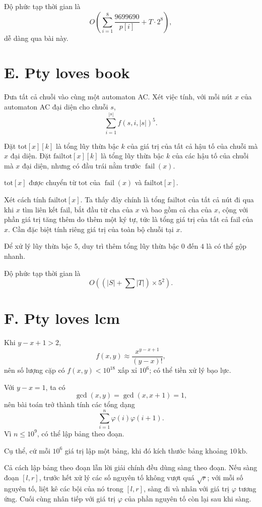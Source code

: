 \documentclass[11pt]{article}
\begin{document}
Độ phức tạp thời gian là
\[
  O\left(\sum_{i=1}^{8}\frac{9699690}{p[i]}+T\cdot 2^8\right),
\]
dễ dàng qua bài này.

\section{E. Pty loves book}

Đưa tất cả chuỗi vào cùng một automaton AC. Xét việc tính, với mỗi nút $x$
của automaton AC đại diện cho chuỗi $s$,
\[
  \sum_{i=1}^{|s|} f(s,i,|s|)^5.
\]

Đặt $\mathrm{tot}[x][k]$ là tổng lũy thừa bậc $k$ của giá trị của tất cả hậu
tố của chuỗi mà $x$ đại diện. Đặt $\mathrm{failtot}[x][k]$ là tổng lũy thừa
bậc $k$ của các hậu tố của chuỗi mà $x$ đại diện, nhưng có đầu trái nằm trước
\(\operatorname{fail}(x)\).

$\mathrm{tot}[x]$ được chuyển từ $\mathrm{tot}$ của
\(\operatorname{fail}(x)\) và $\mathrm{failtot}[x]$.

Xét cách tính $\mathrm{failtot}[x]$. Ta thấy đây chính là tổng
$\mathrm{failtot}$ của tất cả nút đi qua khi $x$ tìm liên kết fail, bắt đầu
từ cha của $x$ và bao gồm cả cha của $x$, cộng với phần giá trị tăng thêm do
thêm một ký tự, tức là tổng giá trị của tất cả fail của $x$. Cần đặc biệt
tính riêng giá trị của toàn bộ chuỗi tại $x$.

Để xử lý lũy thừa bậc $5$, duy trì thêm tổng lũy thừa bậc $0$ đến $4$ là có
thể gộp nhanh.

Độ phức tạp thời gian là
\[
  O\left(\left(|S|+\sum |T|\right)\times 5^2\right).
\]

\section{F. Pty loves lcm}

Khi $y-x+1>2$,
\[
  f(x,y)\approx \frac{x^{y-x+1}}{(y-x)!},
\]
nên số lượng cặp có $f(x,y)<10^{18}$ xấp xỉ $10^6$; có thể tiền xử lý bạo
lực.

Với $y-x=1$, ta có
\[
  \gcd(x,y)=\gcd(x,x+1)=1,
\]
nên bài toán trở thành tính các tổng dạng
\[
  \sum_{i=1}^{n}\varphi(i)\varphi(i+1).
\]
Vì $n\le 10^9$, có thể lập bảng theo đoạn.

Cụ thể, cứ mỗi $10^6$ giá trị lập một bảng, khi đó kích thước bảng khoảng
$10\,\mathrm{kb}$.

Cả cách lập bảng theo đoạn lẫn lời giải chính đều dùng sàng theo đoạn. Nếu
sàng đoạn $[l,r]$, trước hết xử lý các số nguyên tố không vượt quá
$\sqrt r$; với mỗi số nguyên tố, liệt kê các bội của nó trong $[l,r]$, sàng
đi và nhân với giá trị $\varphi$ tương ứng. Cuối cùng nhân tiếp với giá trị
$\varphi$ của phần nguyên tố còn lại sau khi sàng.
\end{document}
